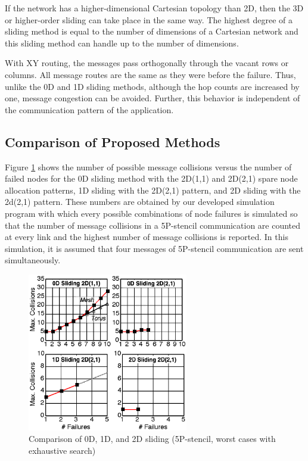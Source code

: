 \documentclass[Afour,times,sagev]{sagej}
\begin{document}
If the network has a
higher-dimensional Cartesian topology than 2D, then the 3D or
higher-order sliding can take place in the same way. The highest
degree of a sliding method is equal to the number of dimensions of a
Cartesian network and this sliding method can handle up to the number
of dimensions. 

With XY routing, the messages pass orthogonally through the vacant
rows or columns. All message routes are the same as they were before
the failure. Thus, unlike the 0D and 1D sliding methods, although the
hop counts are increased by one, message congestion can be
avoided. Further, this behavior is independent of the communication
pattern of the application.

\subsection{Comparison of Proposed Methods}\label{sec:comparison}

Figure \ref{fig:comparison} shows the number of possible message
collisions versus the number of failed nodes for the 0D sliding method
with the 2D(1,1) and 2D(2,1) spare node allocation patterns, 1D
sliding with the 2D(2,1) pattern, and 2D sliding with the 2d(2,1)
pattern. These numbers are obtained by our developed simulation
program with which every possible combinations of node failures is
simulated so that the number of message collisions in a 5P-stencil
communication are counted at every link and the highest number of
message collisions is reported. In this simulation, it is assumed that
four messages of 5P-stencil communication are sent simultaneously. 

\begin{figure}[ht]
\centering
\includegraphics[width=70mm]{Figs/SmallN-Failures.eps}
  \caption{Comparison of 0D, 1D, and 2D sliding (5P-stencil, worst
    cases with exhaustive search)}
  \label{fig:comparison}
\end{figure}
\end{document}

